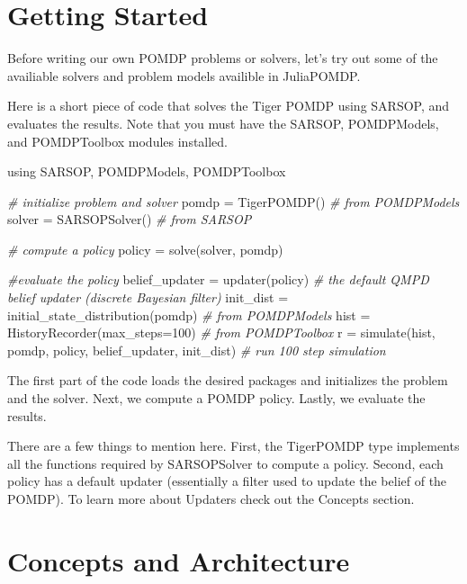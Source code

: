 \documentclass[12pt,]{article}
\newenvironment{Shaded}{}{}
\newcommand{\FloatTok}[1]{\textcolor[rgb]{0.25,0.63,0.44}{{#1}}}
\newcommand{\CommentTok}[1]{\textcolor[rgb]{0.38,0.63,0.69}{\textit{{#1}}}}
\newcommand{\NormalTok}[1]{{#1}}
\begin{document}
\section{Getting Started}\label{getting-started}

Before writing our own POMDP problems or solvers, let's try out some of
the availiable solvers and problem models availible in JuliaPOMDP.

Here is a short piece of code that solves the Tiger POMDP using SARSOP,
and evaluates the results. Note that you must have the SARSOP,
POMDPModels, and POMDPToolbox modules installed.

\begin{Shaded}
\begin{Highlighting}[]
\NormalTok{using SARSOP, POMDPModels, POMDPToolbox}

\CommentTok{# initialize problem and solver}
\NormalTok{pomdp = TigerPOMDP() }\CommentTok{# from POMDPModels}
\NormalTok{solver = SARSOPSolver() }\CommentTok{# from SARSOP}

\CommentTok{# compute a policy}
\NormalTok{policy = solve(solver, pomdp)}

\CommentTok{#evaluate the policy}
\NormalTok{belief_updater = updater(policy) }\CommentTok{# the default QMPD belief updater (discrete Bayesian filter)}
\NormalTok{init_dist = initial_state_distribution(pomdp) }\CommentTok{# from POMDPModels}
\NormalTok{hist = HistoryRecorder(max_steps=}\FloatTok{100}\NormalTok{) }\CommentTok{# from POMDPToolbox}
\NormalTok{r = simulate(hist, pomdp, policy, belief_updater, init_dist) }\CommentTok{# run 100 step simulation}
\end{Highlighting}
\end{Shaded}

The first part of the code loads the desired packages and initializes
the problem and the solver. Next, we compute a POMDP policy. Lastly, we
evaluate the results.

There are a few things to mention here. First, the TigerPOMDP type
implements all the functions required by SARSOPSolver to compute a
policy. Second, each policy has a default updater (essentially a filter
used to update the belief of the POMDP). To learn more about Updaters
check out the Concepts section.

\section{Concepts and Architecture}\label{concepts-and-architecture}
\end{document}
